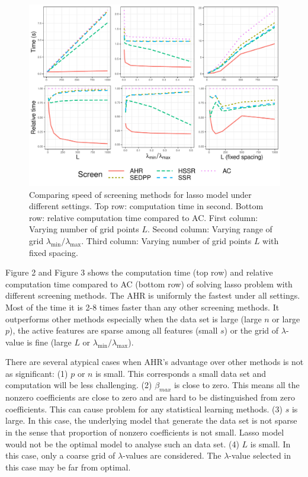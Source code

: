 \begin{figure}[h]
    \centering
    \includegraphics[scale = 0.59]{plots/511b.pdf}    \caption{Comparing speed of screening methods for lasso model under different settings. Top row: computation time in second. Bottom row: relative computation time compared to AC. First column: Varying number of grid points $L$. Second column: Varying range of grid $\lambda_{\min}/\lambda_{\max}$. Third column: Varying number of grid points $L$ with fixed spacing.}
    \label{fig:5.1.1b}
\end{figure}

Figure 2 and Figure 3 shows the computation time (top row) and relative computation time compared to AC (bottom row) of solving lasso problem with different screening methods. The AHR is uniformly the fastest under all settings. Most of the time it is 2-8 times faster than any other screening methods. It outperforms other methods especially when the data set is large (large $n$ or large $p$), the active features are sparse among all features (small $s$) or the grid of $\lambda$-value is fine (large $L$ or $\lambda_{\min}/\lambda_{\max}$). 

There are several atypical cases when AHR's advantage over other methods is not as significant: (1) $p$ or $n$ is small. This corresponds a small data set and computation will be less challenging. (2) $\beta_{max}$ is close to zero. This means all the nonzero coefficients are close to zero and are hard to be distinguished from zero coefficients. This can cause problem for any statistical learning methods. (3) $s$ is large. In this case, the underlying model that generate the data set is not sparse in the sense that proportion of nonzero coefficients is not small. Lasso model would not be the optimal model to analyse such an data set. (4) $L$ is small. In this case, only a coarse grid of $\lambda$-values are considered. The $\lambda$-value selected in this case may be far from optimal.

